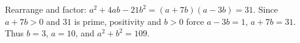 Rearrange and factor: $a^2+4ab-21b^2=(a+7b)(a-3b)=31$. Since $a+7b>0$ and $31$ is prime, positivity and $b>0$ force $a-3b=1$, $a+7b=31$. Thus $b=3$, $a=10$, and $a^2+b^2=\boxed{109}$.
